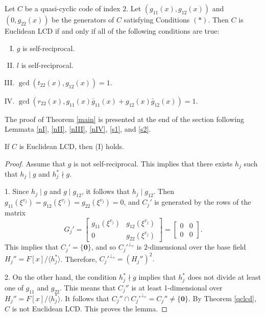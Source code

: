 \documentclass[a4paper,12pt]{article}
\begin{document}
\begin{theorem} \label{main} Let $C$ be a quasi-cyclic code   of index $2$. Let $(g_{11}(x), g_{12}(x))$ and $(0, g_{22}(x))$ be the generators of $C$ satisfying Conditions $(\ast)$.   
	Then $C$ is Euclidean LCD if and only if all of the following conditions are true:
	\begin{enumerate}[(I)]
		\item  $g$ is self-reciprocal.
		\item  $l$ is self-reciprocal. 
		\item  $\gcd(t_{22}(x),g_{12}(x))=1$. 
		\item $\gcd(r_{22}(x), g_{11}(x)\bar{g}_{11}(x)+g_{12}(x) \bar{g}_{12}(x))=1$.
	\end{enumerate}
\end{theorem}


The proof of Theorem \ref{main} is presented at the end of the section following Lemmata \ref{nI}, \ref{nII}, \ref{nIII}, \ref{nIV}, \ref{s1}, and \ref{s2}.


\begin{lemma} \label{nI} If $C$ is Euclidean LCD, then  (I) holds. 
\end{lemma}
\begin{proof} Assume that  $g$ is not self-reciprocal. This implies that there exists $h_j$ such that $h_j\mid g$ and  $h_j^*  \nmid g$. 

1. Since $h_j \mid g$ and $g\mid g_{12}$, it follows that $h_j\mid g_{12}$. Then $g_{11}(\xi^{v_j})= g_{12}(\xi^{v_j})=g_{22}(\xi^{v_j}) =0$, and $C_j'$ is generated by the rows of the  matrix
\[
G_j'=\begin{bmatrix}
g_{11}(\xi^{v_j}) & g_{12}(\xi^{v_j}) \\
0 & g_{22}(\xi^{v_j}) 
\end{bmatrix}    = \begin{bmatrix}
0 & 0 \\
0 & 0 
\end{bmatrix}. 
\]
This implies that $C_j'= \{ \mathbf{0} \}$, and so ${C_j'}^{\perp_e}$ is $2$-dimensional over  the base field $H_j''= F[x]/\langle h^*_j \rangle$. Therefore, ${C_j'}^{\perp_e}=(H_j'')^2.$

2. On the other hand,  the condition $h_j^* \nmid g$ implies that $h_j^* $ does not divide at least one of $g_{11}$ and $g_{22}$.  
This means that $C_j''$ is at least 1-dimensional over $H_j''= F[x]/\langle h_j^* \rangle$.  It follows that $C_j'' \cap {C_j'}^{\perp_e}=C_j'' \ne \{\mathbf{0}\}$. By Theorem \ref{qclcd}, $C$ is not Euclidean LCD. This proves the lemma.
\end{proof}
\end{document}
